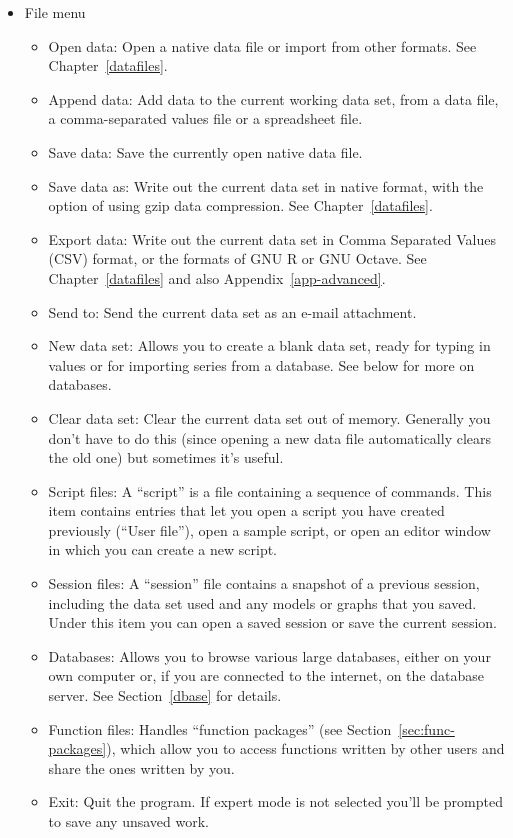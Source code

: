 \begin{itemize}
\item \textsf{File menu}
  \begin{itemize}
  \item \textsf{Open data}: Open a native  data file or
    import from other formats.  See Chapter~\ref{datafiles}.
  \item \textsf{Append data}: Add data to the current working data
    set, from a  data file, a comma-separated values file
    or a spreadsheet file.
  \item \textsf{Save data}: Save the currently open native 
    data file.
  \item \textsf{Save data as}: Write out the current data set in
    native format, with the option of using gzip data compression. See
    Chapter~\ref{datafiles}.
  \item \textsf{Export data}: Write out the current data set in Comma
    Separated Values (CSV) format, or the formats of GNU R or GNU
    Octave. See Chapter~\ref{datafiles} and also
    Appendix~\ref{app-advanced}.
  \item \textsf{Send to}: Send the current data set as an e-mail
    attachment.
  \item \textsf{New data set}: Allows you to create a blank data set,
    ready for typing in values or for importing series from a
    database.  See below for more on databases.
  \item \textsf{Clear data set}: Clear the current data set out of
    memory.  Generally you don't have to do this (since opening a new
    data file automatically clears the old one) but sometimes it's
    useful.
  \item \textsf{Script files}: A ``script'' is a file containing a
    sequence of  commands.  This item contains entries
    that let you open a script you have created previously (``User
    file''), open a sample script, or open an editor window in which
    you can create a new script.
  \item \textsf{Session files}: A ``session'' file contains a snapshot
    of a previous  session, including the data set used
    and any models or graphs that you saved.  Under this item you
    can open a saved session or save the current session.
  \item \textsf{Databases}: Allows you to browse various large
    databases, either on your own computer or, if you are connected
    to the internet, on the  database server.  See
    Section~\ref{dbase} for details.
  \item \textsf{Function files}: Handles ``function packages'' (see
    Section~\ref{sec:func-packages}), which allow you to access
    functions written by other users and share the ones written by
    you.
  \item \textsf{Exit}: Quit the program. If expert mode is not
    selected you'll be prompted to save any unsaved work.
  \end{itemize}


\end{itemize}
